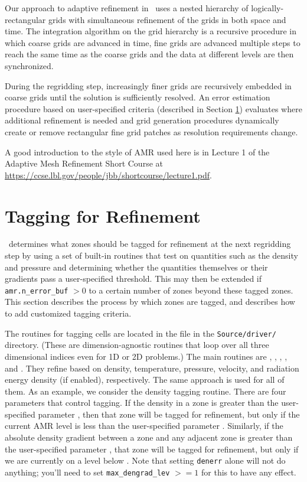 Our approach to adaptive refinement in \castro\ uses a nested hierarchy
of logically-rectangular grids with simultaneous refinement of the
grids in both space and time.  The integration algorithm on the grid
hierarchy is a recursive procedure in which coarse grids are advanced
in time, fine grids are advanced multiple steps to reach the same time
as the coarse grids and the data at different levels are then
synchronized.

During the regridding step, increasingly finer grids
are recursively embedded in coarse grids until the solution is
sufficiently resolved.  An error estimation procedure based on
user-specified criteria (described in Section \ref{sec:tagging}) 
evaluates where additional refinement is needed
and grid generation procedures dynamically create or
remove rectangular fine grid patches as resolution requirements change.

A good introduction to the style of AMR used here is in Lecture 1
of the Adaptive Mesh Refinement Short Course at
\url{https://ccse.lbl.gov/people/jbb/shortcourse/lecture1.pdf}.

\section{Tagging for Refinement}
\label{sec:tagging}

\castro\ determines what zones should be tagged for refinement at the
next regridding step by using a set of built-in routines that test on
quantities such as the density and pressure and determining whether
the quantities themselves or their gradients pass a user-specified
threshold.  This may then be extended if {\tt amr.n\_error\_buf} $> 0$
to a certain number of zones beyond these tagged zones. This section
describes the process by which zones are tagged, and describes how to
add customized tagging criteria.

The routines for tagging cells are located in the
 file in the {\tt Source/driver/} directory. (These are
dimension-agnostic routines that loop over all three dimensional
indices even for 1D or 2D problems.) The main routines are
, , ,
, and . They refine based on
density, temperature, pressure, velocity, and radiation energy density
(if enabled), respectively. The same approach is used for all of
them. As an example, we consider the density tagging routine. There
are four parameters that control tagging. If the density in a zone is
greater than the user-specified parameter , then that
zone will be tagged for refinement, but only if the current AMR level
is less than the user-specified parameter .
Similarly, if the absolute density gradient between a zone and any
adjacent zone is greater than the user-specified parameter
, that zone will be tagged for refinement, but only
if we are currently on a level below
. Note that setting {\tt denerr} alone
will not do anything; you'll need to set {\tt max\_dengrad\_lev} $>=
1$ for this to have any effect.

